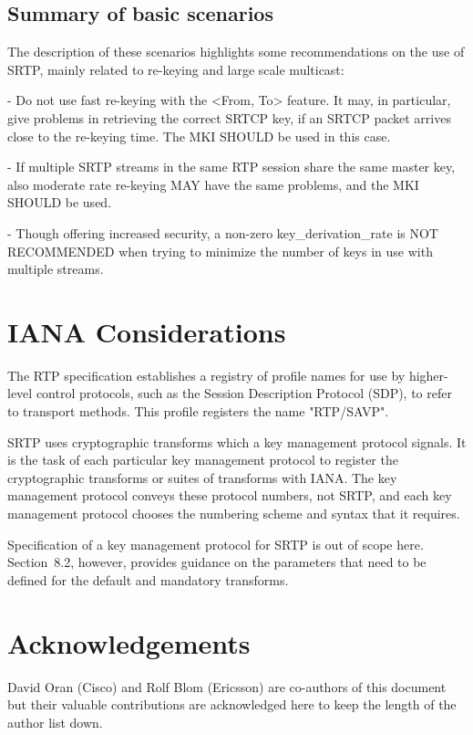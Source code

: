 \documentclass{article}
\begin{document}
\subsection{Summary of basic scenarios}

The description of these scenarios highlights some recommendations on the use of SRTP, mainly related to re-keying and large scale multicast:

- Do not use fast re-keying with the <From, To> feature.  It may, in particular, give problems in retrieving the correct SRTCP key, if an SRTCP packet arrives close to the re-keying time.  The MKI SHOULD be used in this case.

- If multiple SRTP streams in the same RTP session share the same master key, also moderate rate re-keying MAY have the same problems, and the MKI SHOULD be used.

- Though offering increased security, a non-zero key\_derivation\_rate is NOT RECOMMENDED when trying to minimize the number of keys in use with multiple streams.

\section{IANA Considerations}

The RTP specification establishes a registry of profile names for use by higher-level control protocols, such as the Session Description Protocol (SDP), to refer to transport methods.  This profile registers the name "RTP/SAVP".

SRTP uses cryptographic transforms which a key management protocol signals.  It is the task of each particular key management protocol to register the cryptographic transforms or suites of transforms with IANA.  The key management protocol conveys these protocol numbers, not SRTP, and each key management protocol chooses the numbering scheme and syntax that it requires.

Specification of a key management protocol for SRTP is out of scope here.  Section~8.2, however, provides guidance on the parameters that need to be defined for the default and mandatory transforms.

\section{Acknowledgements}

David Oran (Cisco) and Rolf Blom (Ericsson) are co-authors of this document but their valuable contributions are acknowledged here to keep the length of the author list down.
\end{document}
